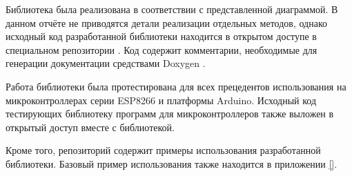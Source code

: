 
Библиотека была реализована в соответствии с представленной диаграммой.
В данном отчёте не приводятся детали реализации отдельных методов, однако исходный код разработанной библиотеки находится в открытом доступе в специальном репозитории \cite{web:my-eemanager}.
Код содержит комментарии, необходимые для генерации документации средствами Doxygen \cite{web:doxygen}.

Работа библиотеки была протестирована для всех прецедентов использования на микроконтроллерах серии ESP8266 и платформы Arduino.
Исходный код тестирующих библиотеку программ для микроконтроллеров также выложен в открытый доступ вместе с библиотекой.

Кроме того, репозиторий содержит примеры использования разработанной библиотеки.
Базовый пример использования также находится в приложении \ref{}.
